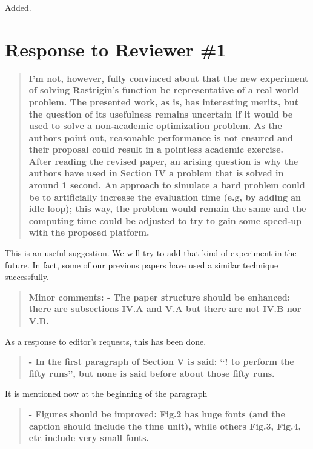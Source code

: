 \documentclass[preprint]{elsarticle}
\begin{document}
Added. 

\section{Response to Reviewer \#1}


\begin{quote}
\textbf{I'm not, however, fully convinced about that the new experiment of solving Rastrigin's function be representative of a real world problem. The presented work, as is, has interesting merits, but the question of its usefulness remains uncertain if it would be used to solve a non-academic optimization problem. As the authors point out, reasonable performance is not ensured and their proposal could result in a pointless academic exercise.\\
After reading the revised paper, an arising question is why the
authors have used in Section IV a problem that is solved in around 1
second. An approach to simulate a hard problem could be to
artificially increase the evaluation time (e.g, by adding an idle
loop); this way, the problem would remain the same and the computing
time could be adjusted to try to gain some speed-up with the proposed
platform.\\}\end{quote}


This is an useful suggestion. We will try to add that kind of
experiment in the future. In fact, some of our previous papers have
used a similar technique successfully.

\begin{quote}
\textbf{Minor comments:
- The paper structure should be enhanced: there are subsections IV.A and V.A but there are not
IV.B nor V.B.}\end{quote}


As a response to editor's requests, this has been done. 

\begin{quote}
\textbf{- In the first paragraph of Section V is said: ``! to perform the fifty runs'', but none is said before
about those fifty runs.}\end{quote}


It is mentioned now at the beginning of the paragraph

\begin{quote}
\textbf{- Figures should be improved: Fig.2 has huge fonts (and the caption should include the time unit),
while others Fig.3, Fig.4, etc include very small fonts.}\end{quote}
\end{document}
